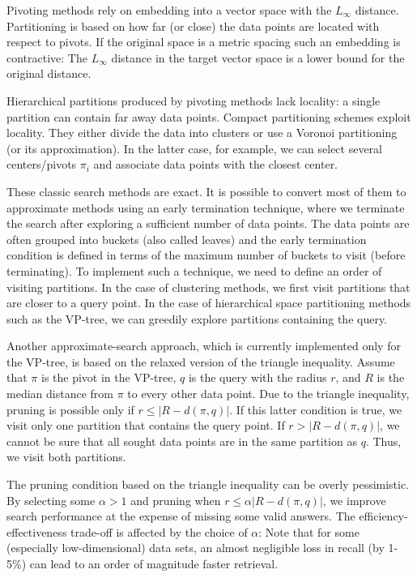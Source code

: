 \documentclass[runningheads,a4paper]{llncs}
\begin{document}
Pivoting methods rely on embedding into a vector space with the $L_{\infty}$ distance.
Partitioning is based on how far (or close) the data points are located with respect to pivots.
If the original space is a metric spacing such an embedding is contractive:
The $L_{\infty}$ distance in the target vector space is a lower bound for the original distance.

Hierarchical partitions produced by pivoting methods lack locality: a single partition can contain
far away data points. Compact partitioning schemes exploit locality.
They either divide the data into clusters or use a Voronoi partitioning (or its approximation).
In the latter case, for example, we can select several centers/pivots $\pi_i$ and associate 
data points with the closest center.

These classic search methods are exact. It is possible to convert most of them to approximate
methods using an early termination technique,
where we terminate the search after exploring a sufficient number of data points.
The data points are often grouped into buckets (also called leaves) and 
the early termination condition is defined in terms of 
the maximum number of buckets to visit (before terminating).
To implement such a technique, we need to define an order of visiting partitions.
In the case of clustering methods, we first visit partitions that are closer to a query point.
In the case of hierarchical space partitioning methods such as the VP-tree,
we can greedily explore partitions containing the query.

Another approximate-search approach, 
which is currently implemented only for the VP-tree, 
is based on the relaxed version of the triangle inequality.
Assume that $\pi$ is the pivot in the VP-tree, $q$ is the query with the radius $r$, 
and $R$ is the median distance from $\pi$ to every other data point.
Due to the triangle inequality, pruning is possible only if $r \le |R - d(\pi, q)|$. 
If this latter condition is true, 
we visit only one partition that contains the query point.
If $r > |R - d(\pi, q)|$, we cannot be sure that all sought data points 
are in the same partition as $q$. Thus, we visit both partitions.

The pruning condition based on the triangle inequality can be overly pessimistic.
By selecting some $\alpha > 1$ and pruning when $r \le \alpha |R - d(\pi, q)|$,
we improve search performance at the expense of missing some valid answers.
The efficiency-effectiveness trade-off is affected by the choice of $\alpha$:
Note that for some (especially low-dimensional) data sets, an almost negligible 
loss in recall (by 1-5\%) can lead to an order of magnitude faster retrieval.
\end{document}
